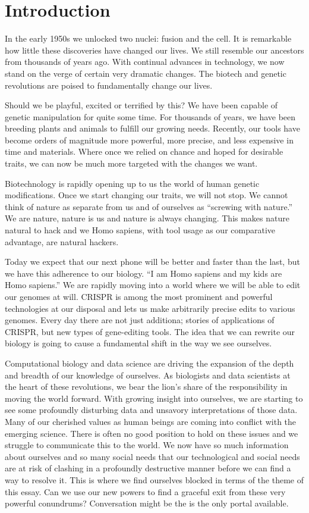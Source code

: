 \section{Introduction}
\label{sec:introduction}

In the early 1950s we unlocked two nuclei: fusion and the cell.
It is remarkable how little these discoveries have changed our lives.
We still resemble our ancestors from thousands of years ago.
With continual advances in technology, we now stand on the verge of certain very dramatic changes.
The biotech and genetic revolutions are poised to fundamentally change our lives.

Should we be playful, excited or terrified by this?
We have been capable of genetic manipulation for quite some time.
For thousands of years, we have been breeding plants and animals to fulfill our growing needs.
Recently, our tools have become orders of magnitude more powerful, more precise, and less expensive in time and materials.
Where once we relied on chance and hoped for desirable traits, we can now be much more targeted with the changes we want.

Biotechnology is rapidly opening up to us the world of human genetic modifications.
Once we start changing our traits, we will not stop.
We cannot think of nature as separate from us and of ourselves as ``screwing with nature.''
We are nature, nature is us and nature is always changing.
This makes nature natural to hack and we Homo sapiens, with tool usage as our comparative advantage, are natural hackers.

Today we expect that our next phone will be better and faster than the last, but we have this adherence to our biology.
``I am Homo sapiens and my kids are Homo sapiens.''
We are rapidly moving into a world where we will be able to edit our genomes at will.
CRISPR is among the most prominent and powerful technologies at our disposal and lets us make arbitrarily precise edits to various genomes.
Every day there are not just additiona; stories of applications of CRISPR, but new types of gene-editing tools.
The idea that we can rewrite our biology is going to cause a fundamental shift in the way we see ourselves.

Computational biology and data science are driving the expansion of the depth and breadth of our knowledge of ourselves.
As biologists and data scientists at the heart of these revolutions, we bear the lion's share of the responsibility in moving the world forward.
With growing insight into ourselves, we are starting to see some profoundly disturbing data and unsavory interpretations of those data.
Many of our cherished values as human beings are coming into conflict with the emerging science.
There is often no good position to hold on these issues and we struggle to communicate this to the world.
We now have so much information about ourselves and so many social needs that our technological and social needs are at risk of clashing in a profoundly destructive manner before we can find a way to resolve it.
This is where we find ourselves blocked in terms of the theme of this essay.
Can we use our new powers to find a graceful exit from these very powerful conundrums?
Conversation might be the is the only portal available.


